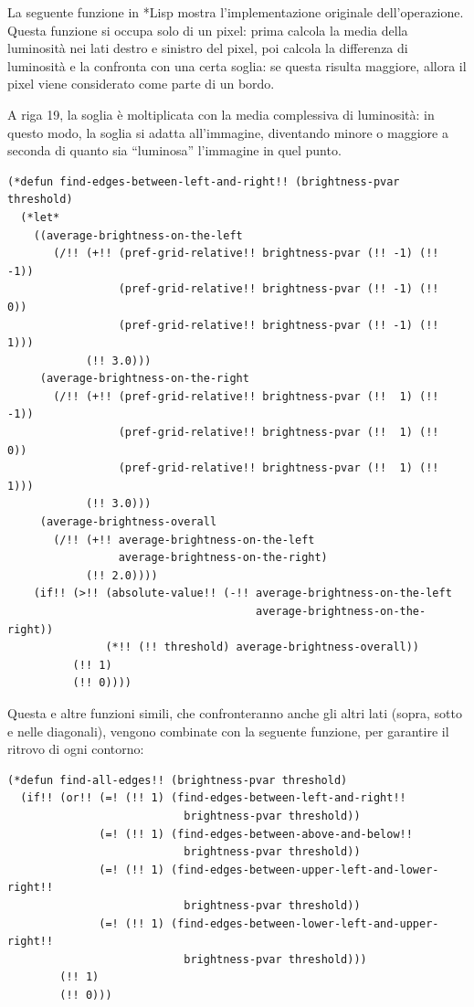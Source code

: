 \documentclass[12pt,a4paper,openright,twoside]{report}
\begin{document}
La seguente funzione in *Lisp mostra l'implementazione originale dell'operazione. Questa funzione si occupa solo di un pixel: prima calcola la media della luminosità nei lati destro e sinistro del pixel, poi calcola la differenza di luminosità e la confronta con una certa soglia: se questa risulta maggiore, allora il pixel viene considerato come parte di un bordo.

A riga 19, la soglia è moltiplicata con la media complessiva di luminosità: in questo modo, la soglia si adatta all'immagine, diventando minore o maggiore a seconda di quanto sia ``luminosa'' l'immagine in quel punto.

\begin{lstlisting}[style=mystyle]
(*defun find-edges-between-left-and-right!! (brightness-pvar threshold)
  (*let*
    ((average-brightness-on-the-left
       (/!! (+!! (pref-grid-relative!! brightness-pvar (!! -1) (!! -1))
                 (pref-grid-relative!! brightness-pvar (!! -1) (!!  0))
                 (pref-grid-relative!! brightness-pvar (!! -1) (!!  1)))
            (!! 3.0)))
     (average-brightness-on-the-right
       (/!! (+!! (pref-grid-relative!! brightness-pvar (!!  1) (!! -1))
                 (pref-grid-relative!! brightness-pvar (!!  1) (!!  0))
                 (pref-grid-relative!! brightness-pvar (!!  1) (!!  1)))
            (!! 3.0)))
     (average-brightness-overall
       (/!! (+!! average-brightness-on-the-left
                 average-brightness-on-the-right)
            (!! 2.0))))
    (if!! (>!! (absolute-value!! (-!! average-brightness-on-the-left
                                      average-brightness-on-the-right))
               (*!! (!! threshold) average-brightness-overall))
          (!! 1)
          (!! 0))))
\end{lstlisting}

Questa e altre funzioni simili, che confronteranno anche gli altri lati (sopra, sotto e nelle diagonali), vengono combinate con la seguente funzione, per garantire il ritrovo di ogni contorno:

\begin{lstlisting}[style=mystyle]
(*defun find-all-edges!! (brightness-pvar threshold)
  (if!! (or!! (=! (!! 1) (find-edges-between-left-and-right!!
                           brightness-pvar threshold))
              (=! (!! 1) (find-edges-between-above-and-below!!
                           brightness-pvar threshold))
              (=! (!! 1) (find-edges-between-upper-left-and-lower-right!!
                           brightness-pvar threshold))
              (=! (!! 1) (find-edges-between-lower-left-and-upper-right!!
                           brightness-pvar threshold)))
        (!! 1)
        (!! 0)))
\end{lstlisting}
\end{document}

